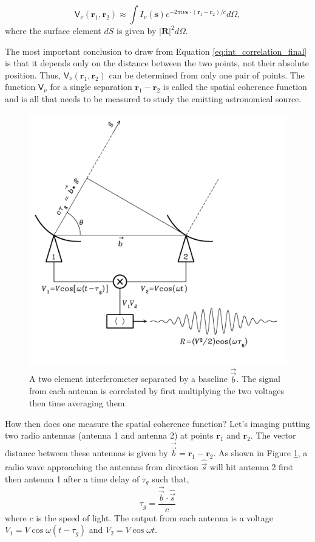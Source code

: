 \begin{equation}
\label{eq:int_correlation_final}
\mathsf{V}_\nu (\mathbf{r}_1, \mathbf{r}_2) \approx \int I_\nu(\mathbf{s}) e^{-2 \pi i \nu\mathbf{s} \cdot (\mathbf{r}_1 - \mathbf{r}_2)/c} d\Omega,
\end{equation}
where the surface element $dS$ is given by $\vert \mathbf{R} \vert ^2 d\Omega$.

The most important conclusion to draw from Equation \ref{eq:int_correlation_final} is that it depends only on the distance between the two points, not their absolute position. Thus, $\mathsf{V}_\nu (\mathbf{r}_1, \mathbf{r}_2)$ can be determined from only one pair of points. The function $\mathsf{V}_\nu$ for a single separation $\mathbf{r}_1 - \mathbf{r}_2$ is called the spatial coherence function and is all that needs to be measured to study the emitting astronomical source.

\begin{figure}[ht]
    \centering
    \includegraphics[width=0.75\columnwidth]{Images/2_elem_int.png}
    \caption[A two element interferometer]{A two element interferometer separated by a baseline $\overrightarrow{\Vec{b}}$. The signal from each antenna is correlated by first multiplying the two voltages then time averaging them.}
    \label{fig:2_el_int}
\end{figure}

How then does one measure the spatial coherence function? Let's imaging putting two radio antennas (antenna 1 and antenna 2) at points $\mathbf{r}_1$ and $\mathbf{r}_2$. The vector distance between these antennas is given by $\overrightarrow{\Vec{b}} = \mathbf{r}_1 - \mathbf{r}_2$. As shown in Figure \ref{fig:2_el_int}, a radio wave approaching the antennas from direction $\hat{\Vec{s}}$  will hit antenna 2 first then antenna 1 after a time delay of $\tau_g$ such that,
\begin{equation}
\label{eq:time_delay}
\tau_g = \frac{\overrightarrow{\Vec{b}} \cdot \hat{\Vec{s}}}{c}
\end{equation}
where $c$ is the speed of light. The output from each antenna is a voltage $V_1 = V \cos{\omega(t - \tau_g)}$ and $V_2 = V\cos{\omega t}$. 



